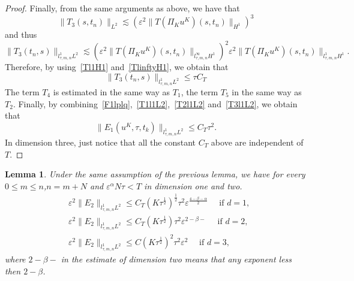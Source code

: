 \documentclass[10pt,a4paper]{article}
\newtheorem{lemma}[theorem]{Lemma}
\newtheorem{remark}[theorem]{Remark}
\begin{document}
\begin{proof}
    Finally, from the same arguments as above, we have that 
    \[ \|T_3(s,t_n)\|_{L^2}  \lesssim \left(\varepsilon^2\|T(\Pi_K u^K)(s, t_n) \|_{H^1}\right)^3 \]
    and thus 
    \[ \|T_3(t_n,s)\|_{l^1_{\tau,m,n}L^2} \lesssim \left(\varepsilon^2 
    \|T(\Pi_K u^K)(s,t_n)\|_{l^\infty_{\tau,m,n}H^1}\right)^2 \varepsilon^2 
    \|T(\Pi_K u^K)(s,t_n)\|_{l^1_{\tau,m,n}H^1}. \]
    Therefore, by using~\eqref{Tl1H1} and~\eqref{TlinftyH1}, we obtain that 
    \begin{equation}\label{T3l1L2}
      \|T_3(t_n,s)\|_{l^1_{\tau,m,n}L^2} \leq \tau C_T
    \end{equation}
    The term \(T_4\) is estimated in the same way as \(T_1\), the term \(T_5\)
    in the same way as \(T_2\). Finally, by combining~\eqref{F1lplq},~\eqref{T1l1L2},~\eqref{T2l1L2} 
    and~\eqref{T3l1L2}, we obtain that 
    \[
      \|E_1(u^K,\tau,t_k)\|_{l^1_{\tau,m,n}L^2} \leq C_T \tau^2.
    \]
    In dimension three, just notice that all the constant \(C_T\) above are
    independent of \(T\).
  \end{proof}


  \begin{lemma}\label{lemE2} %
    Under the same assumption of the previous lemma, we have  for every \(0 \leq
    m \leq n \),\(n = m+N\) and \(\varepsilon^\alpha N\tau < T\) in dimension one
    and two.
    \begin{align}
      &\label{E2d1} \varepsilon^2 \| E_2 \|_{l^1_{\tau,m,n}L^2} \leq C_T (K\tau^\frac12)^\frac12 \tau^2 \varepsilon^{\frac{4-\beta-\alpha}2} 
      \quad \text{ if } d=1,\\
      &\label{E2d2} \varepsilon^2 \| E_2 \|_{l^1_{\tau,m,n}L^2} \leq C_T (K\tau^\frac12) \tau^2 \varepsilon^{2-\beta-}
      \quad \text{ if } d=2,\\
      &\label{E2d3} \varepsilon^2 \| E_2 \|_{l^1_{\tau,m,n}L^2} \leq C (K\tau^\frac12)^2 \tau^2 \varepsilon^2
      \quad \text{ if } d=3,
    \end{align}
    where \(2-\beta-\) in the estimate of dimension two means that any exponent
    less then \(2-\beta\).
  \end{lemma}

\end{document}
